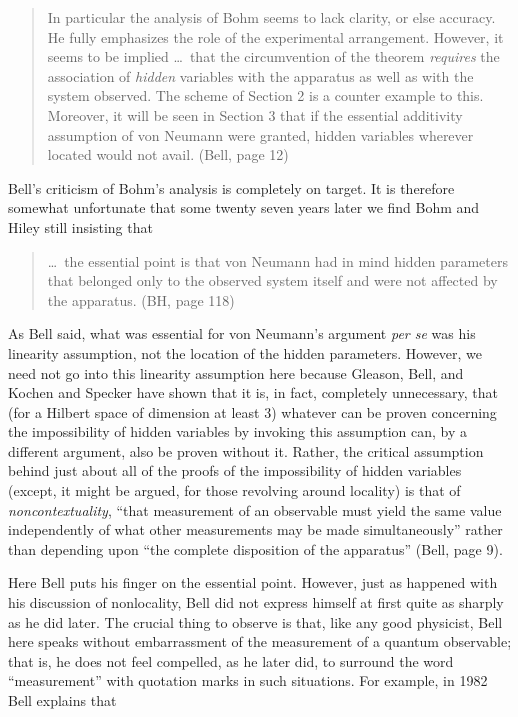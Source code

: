 \documentclass[12pt]{article}
\newcommand\bq{\begin{quotation}}
\newcommand\eq{\end{quotation}}
\begin{document}
\bq\noindent In particular the analysis of Bohm seems to lack clarity, or else
accuracy. He fully emphasizes the role of the experimental arrangement.
However, it seems to be implied \dots\  that the circumvention of the theorem
{\it requires\/}  the association of {\it hidden\/} variables with the
apparatus as well as with the system observed. The scheme of Section 2
is a counter example to this. Moreover, it will be seen in Section 3 that
if the essential additivity assumption of von Neumann were granted, hidden
variables wherever located would not avail. (Bell, page 12)
\eq
Bell's criticism of Bohm's analysis is completely on target. It is therefore
somewhat unfortunate that some twenty seven years later we find Bohm and Hiley
still insisting that

\bq \noindent\dots\  the essential point is that von Neumann had in mind hidden
parameters that belonged only to the observed system itself and were not
affected by the apparatus. (BH, page 118)
\eq

As Bell said, what was essential for von Neumann's argument {\it per se\/}
was his linearity assumption, not the location of the hidden parameters.
However, we need not go into this linearity assumption here because
Gleason, Bell, and Kochen and Specker have shown that it is, in fact,
completely unnecessary, that (for a Hilbert space of dimension at least 3)
whatever can be proven concerning the impossibility of hidden variables by
invoking this assumption can, by a different argument, also be proven
without it. Rather, the critical assumption behind just about all of the
proofs of the impossibility of hidden variables (except, it might be
argued, for those revolving around locality) is that of {\it
noncontextuality\/}, ``that measurement of an observable must yield the
same value independently of what other measurements may be made
simultaneously'' rather than depending upon ``the complete disposition of
the apparatus'' (Bell, page 9).

Here Bell puts his finger on the essential point. However, just as happened
with his discussion of nonlocality, Bell did not express himself at first
quite as sharply as he did later. The crucial thing to observe is that,
like any good physicist, Bell here speaks without embarrassment of the
measurement of a quantum observable; that is, he does not feel compelled,
as he later did, to surround the word ``measurement'' with quotation marks
in such situations. For example, in 1982 Bell explains that
\end{document}
